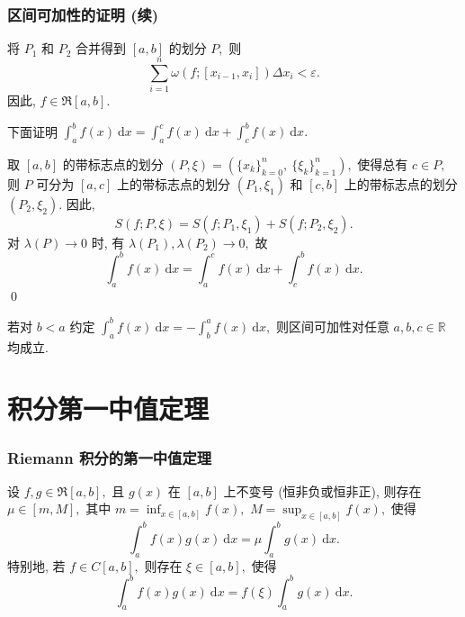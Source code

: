 \begin{frame}
\frametitle{区间可加性的证明 (续)}

将 $P_1$ 和 $P_2$ 合并得到 $[a, b]$ 的划分 $P,$ 则
\[\sum_{i=1}^n \omega(f; [x_{i-1}, x_i]) \Delta x_i < \varepsilon.\]
因此, $f \in \mathfrak{R}[a, b].$

\pause
\vspace{0.5em}

下面证明 $\int_a^b f(x) ~ \mathrm{d} x = \int_a^c f(x) ~ \mathrm{d} x + \int_c^b f(x) ~ \mathrm{d} x.$

取 $[a, b]$ 的带标志点的划分 $(P, \xi) = (\{x_k\}_{k=0}^n,\ \{\xi_k\}_{k=1}^n),$ 使得总有 $c \in P,$ 则 $P$ 可分为 $[a, c]$ 上的带标志点的划分 $(P_1, \xi_1)$ 和 $[c, b]$ 上的带标志点的划分 $(P_2, \xi_2).$ 因此,
\[
S(f; P, \xi) = S(f; P_1, \xi_1) + S(f; P_2, \xi_2).
\]
对 $\lambda(P) \to 0$ 时, 有 $\lambda(P_1), \lambda(P_2) \to 0,$ 故
\[
\int_a^b f(x) ~ \mathrm{d} x = \int_a^c f(x) ~ \mathrm{d} x + \int_c^b f(x) ~ \mathrm{d} x.
\]
\qed

\pause

\begin{remark}
若对 $b < a$ 约定 $\int_a^b f(x) ~ \mathrm{d} x = - \int_b^a f(x) ~ \mathrm{d} x,$ 则区间可加性对任意 $a, b, c \in \mathbb{R}$ 均成立.
\end{remark}

\end{frame}


\section{积分第一中值定理}


\begin{frame}
\frametitle{Riemann 积分的第一中值定理}

\begin{prop}[积分第一中值定理]
设 $f, g \in \mathfrak{R}[a, b],$ 且 $g(x)$ 在 $[a, b]$ 上不变号 (恒非负或恒非正), 则存在 $\mu \in [m, M],$ 其中 $m = \inf_{x \in [a, b]} f(x),$ $M = \sup_{x \in [a, b]} f(x),$ 使得
\[
\int_a^b f(x) g(x) ~ \mathrm{d} x = \mu \int_a^b g(x) ~ \mathrm{d} x.
\]
特别地, 若 $f \in C[a, b],$ 则存在 $\xi \in [a, b],$ 使得
\[
\int_a^b f(x) g(x) ~ \mathrm{d} x = f(\xi) \int_a^b g(x) ~ \mathrm{d} x.
\]
\end{prop}

\end{frame}



